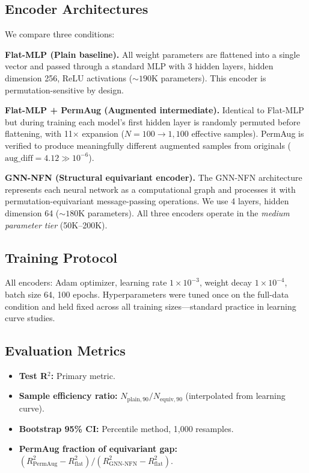 \subsection{Encoder Architectures}

We compare three conditions:

\textbf{Flat-MLP (Plain baseline).} All weight parameters are flattened into a single vector and passed through a standard MLP with 3 hidden layers, hidden dimension 256, ReLU activations (${\sim}190$K parameters). This encoder is permutation-sensitive by design.

\textbf{Flat-MLP + PermAug (Augmented intermediate).} Identical to Flat-MLP but during training each model's first hidden layer is randomly permuted before flattening, with 11$\times$ expansion ($N{=}100 \to 1{,}100$ effective samples). PermAug is verified to produce meaningfully different augmented samples from originals ($\text{aug\_diff}{=}4.12 \gg 10^{-6}$).

\textbf{GNN-NFN (Structural equivariant encoder).} The GNN-NFN architecture \cite{Kofinas2024Graph} represents each neural network as a computational graph and processes it with permutation-equivariant message-passing operations. We use 4 layers, hidden dimension 64 (${\sim}180$K parameters). All three encoders operate in the \emph{medium parameter tier} (50K--200K).

\subsection{Training Protocol}

All encoders: Adam optimizer, learning rate $1{\times}10^{-3}$, weight decay $1{\times}10^{-4}$, batch size 64, 100 epochs. Hyperparameters were tuned once on the full-data condition and held fixed across all training sizes---standard practice in learning curve studies.

\subsection{Evaluation Metrics}

\begin{itemize}
    \item \textbf{Test R$^2$:} Primary metric.
    \item \textbf{Sample efficiency ratio:} $N_{\text{plain},90} / N_{\text{equiv},90}$ (interpolated from learning curve).
    \item \textbf{Bootstrap 95\% CI:} Percentile method, 1,000 resamples.
    \item \textbf{PermAug fraction of equivariant gap:} $(R^2_{\text{PermAug}} - R^2_{\text{flat}}) / (R^2_{\text{GNN-NFN}} - R^2_{\text{flat}})$.
\end{itemize}


